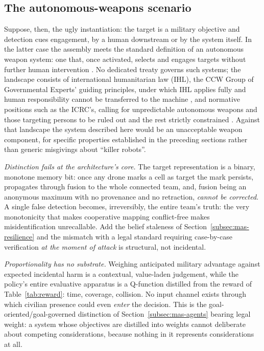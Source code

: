 \subsection{The autonomous-weapons scenario}
\label{subsec:eth-laws}

Suppose, then, the ugly instantiation: the target is a military objective and
detection cues engagement, by a human downstream or by the system itself. In the
latter case the assembly meets the standard definition of an autonomous weapon
system: one that, once activated, selects and engages targets without further
human intervention \citep{dod2012autonomy}. No dedicated treaty governs such
systems; the landscape consists of international humanitarian law (IHL), the CCW
Group of Governmental Experts' guiding principles, under which IHL applies fully
and human responsibility cannot be transferred to the machine
\citep{ccw2019guiding}, and normative positions such as the ICRC's, calling for
unpredictable autonomous weapons and those targeting persons to be ruled out and
the rest strictly constrained \citep{icrc2021position,sharkey2019autonomous}.
Against that landscape the system described here would be an unacceptable weapon
component, for specific properties established in the preceding sections rather
than generic misgivings about ``killer robots''.

\emph{Distinction fails at the architecture's core.} The target representation is
a binary, monotone memory bit: once any drone marks a cell as target the mark
persists, propagates through fusion to the whole connected team, and, fusion
being an anonymous maximum with no provenance and no retraction, \emph{cannot be
corrected}. A single false detection becomes, irreversibly, the entire team's
truth: the very monotonicity that makes cooperative mapping conflict-free makes
misidentification unrecallable. Add the belief staleness of
Section~\ref{subsec:mas-resilience} and the mismatch with a legal standard
requiring case-by-case verification \emph{at the moment of attack} is structural,
not incidental.

\emph{Proportionality has no substrate.} Weighing anticipated military advantage
against expected incidental harm is a contextual, value-laden judgement, while
the policy's entire evaluative apparatus is a Q-function distilled from the
reward of Table~\ref{tab:reward}: time, coverage, collision. No input channel
exists through which civilian presence could even \emph{enter} the decision. This
is the goal-oriented/goal-governed distinction of
Section~\ref{subsec:mas-agents} bearing legal weight: a system whose objectives
are distilled into weights cannot deliberate about competing considerations,
because nothing in it represents considerations at all.

